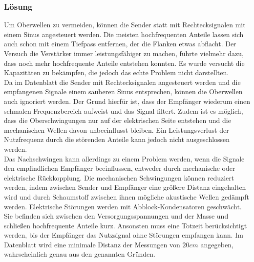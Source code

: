 \subsubsection{Lösung}
Um Oberwellen zu vermeiden, können die Sender statt mit Rechtecksignalen mit einem Sinus angesteuert werden. Die meisten hochfrequenten Anteile lassen sich auch schon mit einem Tiefpass entfernen, der die Flanken etwas abflacht. Der Versuch die Verstärker immer leistungsfähiger zu machen, führte vielmehr dazu, dass noch mehr hochfrequente Anteile entstehen konnten. Es wurde versucht die Kapazitäten zu bekämpfen, die jedoch das echte Problem nicht darstellten.\\
Da im Datenblatt die Sender mit Rechtecksignalen angesteuert werden und die empfangenen Signale einem sauberen Sinus entsprechen, können die Oberwellen auch ignoriert werden. Der Grund hierfür ist, dass der Empfänger wiederum einen schmalen Frequenzbereich aufweist und das Signal filtert. Zudem ist es möglich, dass die Oberschwingungen nur auf der elektrischen Seite entstehen und die mechanischen Wellen davon unbeeinflusst bleiben. Ein Leistungsverlust der Nutzfrequenz durch die störenden Anteile kann jedoch nicht ausgeschlossen werden.\\
Das Nachschwingen kann allerdings zu einem Problem werden, wenn die Signale den empfindlichen Empfänger beeinflussen, entweder durch mechanische oder elektrische Rückkopplung. Die mechanischen Schwingungen können reduziert werden, indem zwischen Sender und Empfänger eine größere Distanz eingehalten wird und durch Schaumstoff zwischen ihnen mögliche akustische Wellen gedämpft werden. Elektrische Störungen werden mit Abblock-Kondensatoren geschwächt. Sie befinden sich zwischen den Versorgungsspannungen und der Masse und schließen hochfrequente Anteile kurz. Ansonsten muss eine Totzeit berücksichtigt werden, bis der Empfänger das Nutzsignal ohne Störungen empfangen kann. Im Datenblatt wird eine minimale Distanz der Messungen von $20cm$ angegeben, wahrscheinlich genau aus den genannten Gründen.
